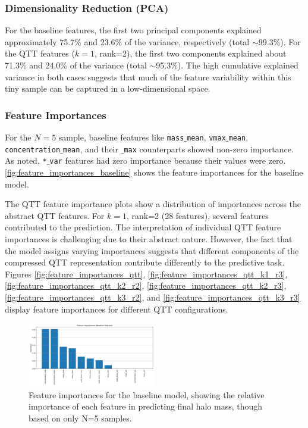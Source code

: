 \documentclass[twocolumn]{aastex631}
\begin{document}
\subsubsection{Dimensionality Reduction (PCA)}
For the baseline features, the first two principal components explained approximately 75.7\% and 23.6\% of the variance, respectively (total $\sim$99.3\%). For the QTT features ($k=1$, rank=2), the first two components explained about 71.3\% and 24.0\% of the variance (total $\sim$95.3\%). The high cumulative explained variance in both cases suggests that much of the feature variability within this tiny sample can be captured in a low-dimensional space.

\subsubsection{Feature Importances}
For the $N=5$ sample, baseline features like \texttt{mass\ensuremath{\_}mean}, \texttt{vmax\ensuremath{\_}mean}, \texttt{concentration\ensuremath{\_}mean}, and their \texttt{\ensuremath{\_}max} counterparts showed non-zero importance. As noted, \texttt{*\ensuremath{\_}var} features had zero importance because their values were zero. \autoref{fig:feature_importances_baseline} shows the feature importances for the baseline model.

The QTT feature importance plots show a distribution of importances across the abstract QTT features. For $k=1$, rank=2 (28 features), several features contributed to the prediction. The interpretation of individual QTT feature importances is challenging due to their abstract nature. However, the fact that the model assigns varying importances suggests that different components of the compressed QTT representation contribute differently to the predictive task. Figures \ref{fig:feature_importances_qtt}, \ref{fig:feature_importances_qtt_k1_r3}, \ref{fig:feature_importances_qtt_k2_r2}, \ref{fig:feature_importances_qtt_k2_r3}, \ref{fig:feature_importances_qtt_k3_r2}, and \ref{fig:feature_importances_qtt_k3_r3} display feature importances for different QTT configurations.

\begin{figure}[h!]
    \centering
    \includegraphics[width=0.5\textwidth]{../input_files/plots/feature_importances_baseline_3_20250524-175150.png}
    \caption{Feature importances for the baseline model, showing the relative importance of each feature in predicting final halo mass, though based on only N=5 samples.
}
    \label{fig:feature_importances_baseline}
\end{figure}
\end{document}

